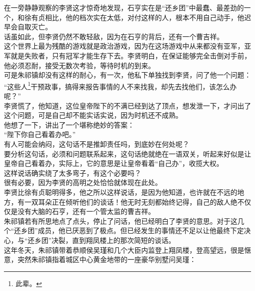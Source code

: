 \begin{multicols}{\theparacolNo}
在一旁静静观察的李贤这才惊奇地发现，石亨实在是“还乡团”中最蠢、最差劲的一个，和徐有贞相比，他的档次实在太低，对付这样的人，根本不用自己动手，他迟早会自取灭亡。\\

话虽如此，但李贤仍然不敢轻敌，因为在石亨的背后，还有一个曹吉祥。\\

这个世界上最为残酷的游戏就是政治游戏，因为在这场游戏中从来都没有亚军，亚军就是失败者，只有冠军才能生存下去。李贤明白，在保证能够完全击倒对手前，他必须忍耐，接受无数次考验，等待时机的到来。\\

可是朱祁镇却没有这样的耐心，有一次，他私下单独找到李贤，问了他一个问题：\\

“这些人\footnote{此辈。}干预政事，搞得来报告事情的人不来找我，却先去找他们，该怎么办呢？”\\

李贤慌了，他知道，这位皇帝陛下的不满已经到达了顶点，想发泄一下，才问出了这个问题，可是自己却不能实话实说，因为时机还不成熟。\\

他想了一下，讲出了一个堪称绝妙的答案：\\

“陛下你自己看着办吧。”\\

有人可能会纳闷，这句话不是推卸责任吗，到底妙在何处呢？\\

要分析这句话，必须和问题联系起来，这句话绝就绝在一语双关，听起来好似是让皇帝自己看着办，实际上，它的意思是让皇帝看着“自己办”，收揽大权。\\

这样说话确实绕了太多弯子，有这个必要吗？\\

很有必要，因为李贤的高明之处恰恰就体现在此处。\\

李贤比徐有贞聪明得多，他之所以这样说话，是因为他知道，也许就在不远的地方，有一双耳朵正在倾听他们的谈话！他无时无刻都始终记得，自己的敌人绝不仅仅是没有大脑的石亨，还有一个管太监的曹吉祥。\\

朱祁镇若有所思地点了点头，停止了问话，他已经明白了李贤的意思。对于这几个“还乡团”成员，他已厌恶到了极点。但已经发生的事情还不足以让他最终下定决心，与“还乡团”决裂，直到翔凤楼上的那次简短的谈话。\\

这年冬天，朱祁镇带着恭顺侯吴瑾和几个大臣内监登上翔凤楼，登高望远，很是惬意，突然朱祁镇指着城区中心黄金地带的一座豪华别墅问吴瑾：\\


\end{multicols}
